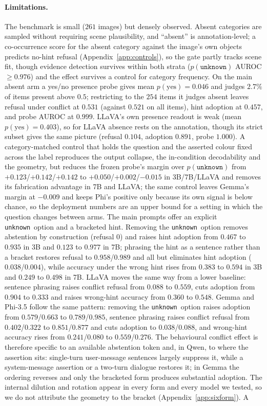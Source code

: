 \documentclass[10pt]{article}
\newcommand{\unknown}{\texttt{unknown}}
\newcommand{\punk}{p(\unknown)}
\begin{document}
\paragraph{Limitations.}
The benchmark is small ($261$ images) but densely observed. Absent categories are sampled without requiring scene plausibility, and ``absent'' is annotation-level; a co-occurrence score for the absent category against the image's own objects predicts no-hint refusal (Appendix~\ref{app:controls}), so the gate partly tracks scene fit, though evidence detection survives within both strata ($\punk$ AUROC $\ge0.976$) and the effect survives a control for category frequency. On the main absent arm a yes/no presence probe gives mean $p(\text{yes})=0.046$ and judges $2.7\%$ of items present above $0.5$; restricting to the $254$ items it judges absent leaves refusal under conflict at $0.531$ (against $0.521$ on all items), hint adoption at $0.457$, and probe AUROC at $0.999$. LLaVA's own presence readout is weak (mean $p(\text{yes})=0.403$), so for LLaVA absence rests on the annotation, though its strict subset gives the same picture (refusal $0.104$, adoption $0.891$, probe $1.000$). A category-matched control that holds the question and the asserted colour fixed across the label reproduces the output collapse, the in-condition decodability and the geometry, but reduces the frozen probe's margin over $\punk$ from $+0.123$/$+0.142$/$+0.142$ to $+0.050$/$+0.002$/$-0.015$ in 3B/7B/LLaVA and removes its fabrication advantage in 7B and LLaVA; the same control leaves Gemma's margin at $-0.009$ and keeps Phi's positive only because its own signal is below chance, so the deployment numbers are an upper bound for a setting in which the question changes between arms. The main prompts offer an explicit \unknown\ option and a bracketed hint. Removing the \unknown\ option removes abstention by construction (refusal $0$) and raises hint adoption from $0.467$ to $0.935$ in 3B and $0.123$ to $0.977$ in 7B; phrasing the hint as a sentence rather than a bracket restores refusal to $0.958$/$0.989$ and all but eliminates hint adoption ($0.038$/$0.004$), while accuracy under the wrong hint rises from $0.383$ to $0.594$ in 3B and $0.249$ to $0.498$ in 7B. LLaVA moves the same way from a lower baseline: sentence phrasing raises conflict refusal from $0.088$ to $0.559$, cuts adoption from $0.904$ to $0.333$ and raises wrong-hint accuracy from $0.360$ to $0.548$. Gemma and Phi-3.5 follow the same pattern: removing the \unknown\ option raises adoption from $0.579$/$0.663$ to $0.789$/$0.985$, sentence phrasing raises conflict refusal from $0.402$/$0.322$ to $0.851$/$0.877$ and cuts adoption to $0.038$/$0.088$, and wrong-hint accuracy rises from $0.241$/$0.080$ to $0.559$/$0.276$. The behavioural conflict effect is therefore specific to an available abstention token and, in Qwen, to where the assertion sits: single-turn user-message sentences largely suppress it, while a system-message assertion or a two-turn dialogue restores it; in Gemma the ordering reverses and only the bracketed form produces substantial adoption. The internal dilution and rotation appear in every form and every model we tested, so we do not attribute the geometry to the bracket (Appendix~\ref{app:sixform}). A 
\end{document}
